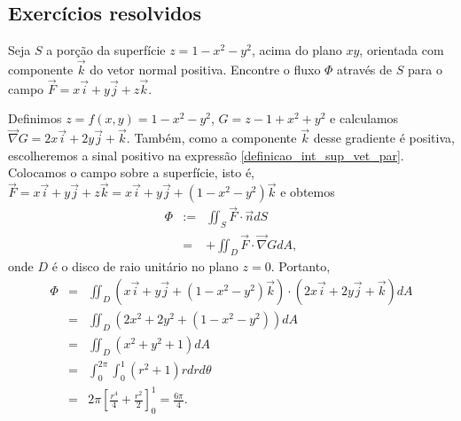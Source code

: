 \subsection*{Exercícios resolvidos}
\begin{exeresol} Seja $S$ a porção da superfície $z=1-x^2-y^2$, acima do plano $xy$, orientada com componente $\vec{k}$ do vetor normal positiva. Encontre o fluxo $\Phi$ através de $S$ para o campo $\vec{F}=x\vec{i}+y\vec{j}+z\vec{k}$.
\end{exeresol}
\begin{resol}
Definimos $z=f(x,y)=1-x^2-y^2$, $G=z-1+x^2+y^2$ e calculamos $\vec{\nabla}G=2x\vec{i}+2y\vec{j}+\vec{k}$. Também, como a componente $\vec{k}$ desse gradiente é positiva, escolheremos a sinal positivo na expressão \eqref{definicao_int_sup_vet_par}. Colocamos o campo sobre a superfície, isto é, $\vec{F}=x\vec{i}+y\vec{j}+z\vec{k}=x\vec{i}+y\vec{j}+(1-x^2-y^2)\vec{k}$ e obtemos
\begin{eqnarray*}
\Phi&:=&\iint_{S} \vec{F}\cdot \vec{n}dS\\
&=&+\iint_D \vec{F}\cdot \vec{\nabla} G dA,
\end{eqnarray*}
onde $D$ é o disco de raio unitário no plano $z=0$. Portanto,
\begin{eqnarray*}
\Phi&=&\iint_D (x\vec{i}+y\vec{j}+(1-x^2-y^2)\vec{k})\cdot (2x\vec{i}+2y\vec{j}+\vec{k}) dA\\
&=&\iint_D (2x^2+2y^2+(1-x^2-y^2))dA\\
&=&\iint_D (x^2+y^2+1)dA\\
&=&\int_0^{2\pi}\int_0^1 (r^2+1)rdrd\theta\\
&=&2\pi \left[ \frac{r^4}{4}+\frac{r^2}{2}\right]_0^1=\frac{6\pi}{4}.
\end{eqnarray*}


\end{resol}

